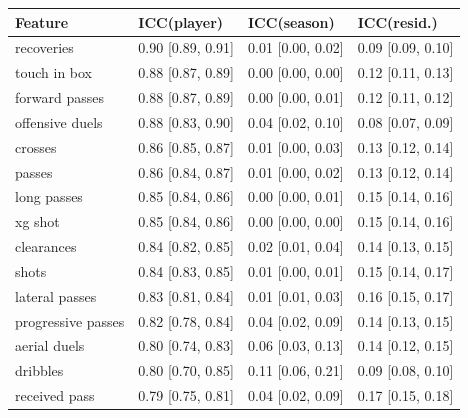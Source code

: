 
\begin{tabular}{llll}
\toprule
Feature & ICC(player) & ICC(season) & ICC(resid.)\\
\midrule
recoveries & 0.90 [0.89, 0.91] & 0.01 [0.00, 0.02] & 0.09 [0.09, 0.10]\\
touch in box & 0.88 [0.87, 0.89] & 0.00 [0.00, 0.00] & 0.12 [0.11, 0.13]\\
forward passes & 0.88 [0.87, 0.89] & 0.00 [0.00, 0.01] & 0.12 [0.11, 0.12]\\
offensive duels & 0.88 [0.83, 0.90] & 0.04 [0.02, 0.10] & 0.08 [0.07, 0.09]\\
crosses & 0.86 [0.85, 0.87] & 0.01 [0.00, 0.03] & 0.13 [0.12, 0.14]\\
passes & 0.86 [0.84, 0.87] & 0.01 [0.00, 0.02] & 0.13 [0.12, 0.14]\\
long passes & 0.85 [0.84, 0.86] & 0.00 [0.00, 0.01] & 0.15 [0.14, 0.16]\\
xg shot & 0.85 [0.84, 0.86] & 0.00 [0.00, 0.00] & 0.15 [0.14, 0.16]\\
clearances & 0.84 [0.82, 0.85] & 0.02 [0.01, 0.04] & 0.14 [0.13, 0.15]\\
shots & 0.84 [0.83, 0.85] & 0.01 [0.00, 0.01] & 0.15 [0.14, 0.17]\\
lateral passes & 0.83 [0.81, 0.84] & 0.01 [0.01, 0.03] & 0.16 [0.15, 0.17]\\
progressive passes & 0.82 [0.78, 0.84] & 0.04 [0.02, 0.09] & 0.14 [0.13, 0.15]\\
aerial duels & 0.80 [0.74, 0.83] & 0.06 [0.03, 0.13] & 0.14 [0.12, 0.15]\\
dribbles & 0.80 [0.70, 0.85] & 0.11 [0.06, 0.21] & 0.09 [0.08, 0.10]\\
received pass & 0.79 [0.75, 0.81] & 0.04 [0.02, 0.09] & 0.17 [0.15, 0.18]\\
\bottomrule
\end{tabular}
